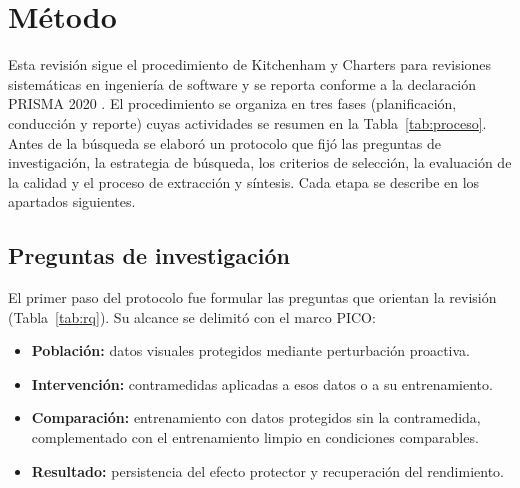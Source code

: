 \section{Método}\label{sec:metodo}

Esta revisión sigue el procedimiento de Kitchenham y Charters para revisiones sistemáticas en ingeniería de software \cite{kitchenham2007} y se reporta conforme a la declaración PRISMA 2020 \cite{page2021prisma}. El procedimiento se organiza en tres fases (planificación, conducción y reporte) cuyas actividades se resumen en la Tabla~\ref{tab:proceso}. Antes de la búsqueda se elaboró un protocolo que fijó las preguntas de investigación, la estrategia de búsqueda, los criterios de selección, la evaluación de la calidad y el proceso de extracción y síntesis.  Cada etapa se describe en los apartados siguientes.



\subsection{Preguntas de investigación}

El primer paso del protocolo fue formular las preguntas que orientan la revisión (Tabla~\ref{tab:rq}). Su alcance se delimitó con el marco PICO:
\begin{itemize}
\item \textbf{Población:} datos visuales protegidos mediante perturbación proactiva.
\item \textbf{Intervención:} contramedidas aplicadas a esos datos o a su entrenamiento.
\item \textbf{Comparación:} entrenamiento con datos protegidos sin la contramedida, complementado con el entrenamiento limpio en condiciones comparables.
\item \textbf{Resultado:} persistencia del efecto protector y recuperación del rendimiento.
\end{itemize}



